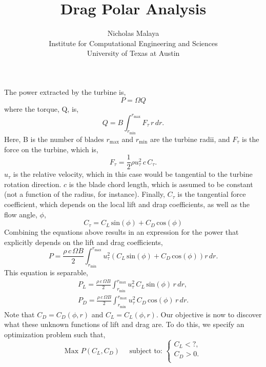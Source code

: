 \documentclass{article}
\title{\bf{Drag Polar Analysis}}
\author{Nicholas Malaya \\ Institute for Computational Engineering and Sciences \\ University of Texas at Austin} \date{}
\begin{document}
\maketitle

\newpage

The power extracted by the turbine is, 
\begin{equation}
 P = \Omega Q
\end{equation}
where the torque, Q, is, 
\begin{equation}
 Q = B \int_{r_{\text{min}}}^{r_{\text{max}}} F_{\tau}\, r\, dr.
\end{equation}
Here, B is the number of blades $r_{\text{max}}$ and $r_{\text{min}}$
are the turbine radii, and $F_{\tau}$ is the force on the turbine, which
is, 
\begin{equation}
 F_{\tau} = \frac{1}{2}\rho u_{\tau}^2 \, c \, C_{\tau}.
\end{equation}
$u_\tau$ is the relative velocity, which in this case would be
tangential to the turbine rotation direction. $c$ is the blade chord
length, which is assumed to be constant (not a function of the radius,
for instance). Finally, $C_{\tau}$ is the tangential force coefficient,
which depends on the local lift and drap coefficients, as well as the
flow angle, $\phi$, 
\begin{equation}
 C_{\tau} = C_L \,\text{sin}(\phi) + C_D \,\text{cos}(\phi)
\end{equation}
Combining the equations above results in an expression for the power
that explicitly depends on the lift and drag coefficients, 
\begin{equation*}
 P = \frac{\rho\, c\, \Omega B}{2}
  \int_{r_{\text{min}}}^{r_{\text{max}}} u_{\tau}^2 \left(C_L
						     \,\text{sin}(\phi)
						     + C_D
						     \,\text{cos}(\phi)
						    \right) r\,dr. 
\end{equation*}
This equation is separable, 
\begin{align*}
 P_L = \frac{\rho\, c\, \Omega B}{2}
  \int_{r_{\text{min}}}^{r_{\text{max}}} u_{\tau}^2 \, C_L \,\text{sin}(\phi)\, r\,dr, \\
 P_D = \frac{\rho\, c\, \Omega B}{2}
  \int_{r_{\text{min}}}^{r_{\text{max}}} u_{\tau}^2 \, C_D \,\text{cos}(\phi)\, r\,dr. 
\end{align*}
Note that $C_D = C_D(\phi,r)$ and $C_L = C_L(\phi,r)$. Our objective is
now to discover what these unknown functions of lift and drag are. To do
this, we specify an optimization problem such that, 
\begin{equation*} 
 \text{Max } P(C_L,C_D) \quad \text{ subject to: }
  \begin{cases}
    C_L < ?, \\
    C_D > 0. \\
  \end{cases}
\end{equation*}
\end{document}
